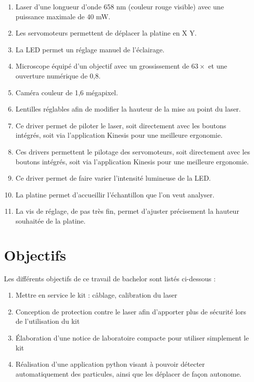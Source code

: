 \begin{enumerate}
    \item Laser d'une longueur d'onde 658 nm (couleur rouge visible) avec une puissance maximale de 40 mW.
    \item Les servomoteurs permettent de déplacer la platine en X Y.
    \item La LED permet un réglage manuel de l'éclairage.
    \item Microscope équipé d'un objectif avec un grossissement de $63\times$ et une ouverture numérique de 0,8.
    \item Caméra couleur de 1,6 mégapixel.
    \item Lentilles réglables afin de modifier la hauteur de la mise au point du laser.
    \item Ce driver permet de piloter le laser, soit directement avec les boutons intégrés, soit via l'application Kinesis \cite{kinesisSoftware} pour une meilleure ergonomie.
    \item Ces drivers permettent le pilotage des servomoteurs, soit directement avec les boutons intégrés, soit via l'application Kinesis pour une meilleure ergonomie.
    \item Ce driver permet de faire varier l'intensité lumineuse de la LED.
    \item La platine permet d'accueillir l'échantillon que l'on veut analyser.
    \item La vis de réglage, de pas très fin, permet d'ajuster précisement la hauteur souhaitée de la platine.
\end{enumerate}

\section{Objectifs}

Les différents objectifs de ce travail de bachelor sont listés ci-dessous :
\begin{enumerate}
    \item Mettre en service le kit : câblage, calibration du laser
    \item Conception de protection contre le laser afin d'apporter plus de sécurité lors de l'utilisation du kit
    \item Élaboration d'une notice de laboratoire compacte pour utiliser simplement le kit
    \item Réalisation d'une application python visant à pouvoir détecter automatiquement des particules, ainsi que les déplacer de façon autonome.
\end{enumerate}

